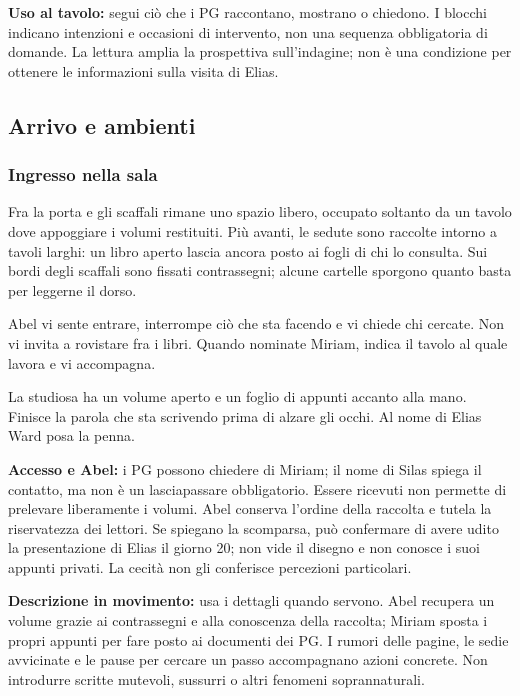 \documentclass[11pt,a4paper]{article}
\begin{document}
\textbf{Uso al tavolo:} segui ciò che i PG raccontano, mostrano o chiedono. I blocchi indicano intenzioni e occasioni di intervento, non una sequenza obbligatoria di domande. La lettura amplia la prospettiva sull'indagine; non è una condizione per ottenere le informazioni sulla visita di Elias.

\subsection{Arrivo e ambienti}
\subsubsection{Ingresso nella sala}
\begin{readaloud}
Fra la porta e gli scaffali rimane uno spazio libero, occupato soltanto da un tavolo dove appoggiare i volumi restituiti. Più avanti, le sedute sono raccolte intorno a tavoli larghi: un libro aperto lascia ancora posto ai fogli di chi lo consulta. Sui bordi degli scaffali sono fissati contrassegni; alcune cartelle sporgono quanto basta per leggerne il dorso.

Abel vi sente entrare, interrompe ciò che sta facendo e vi chiede chi cercate. Non vi invita a rovistare fra i libri. Quando nominate Miriam, indica il tavolo al quale lavora e vi accompagna.

La studiosa ha un volume aperto e un foglio di appunti accanto alla mano. Finisce la parola che sta scrivendo prima di alzare gli occhi. Al nome di Elias Ward posa la penna.
\end{readaloud}

\textbf{Accesso e Abel:} i PG possono chiedere di Miriam; il nome di Silas spiega il contatto, ma non è un lasciapassare obbligatorio. Essere ricevuti non permette di prelevare liberamente i volumi. Abel conserva l'ordine della raccolta e tutela la riservatezza dei lettori. Se spiegano la scomparsa, può confermare di avere udito la presentazione di Elias il giorno 20; non vide il disegno e non conosce i suoi appunti privati. La cecità non gli conferisce percezioni particolari.

\textbf{Descrizione in movimento:} usa i dettagli quando servono. Abel recupera un volume grazie ai contrassegni e alla conoscenza della raccolta; Miriam sposta i propri appunti per fare posto ai documenti dei PG. I rumori delle pagine, le sedie avvicinate e le pause per cercare un passo accompagnano azioni concrete. Non introdurre scritte mutevoli, sussurri o altri fenomeni soprannaturali.
\end{document}
